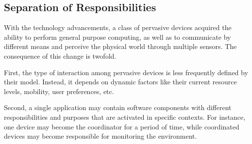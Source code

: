 





\subsection{Separation of Responsibilities}



With the technology advancements, a class of pervasive devices acquired the ability to perform general purpose computing, as well as to communicate by different means and perceive the physical world through multiple sensors. The consequence of this change is twofold.

First, the type of interaction among pervasive devices is less frequently defined by their model. Instead, it depends on dynamic factors like their current resource levels, mobility, user preferences, etc. 

Second, a single application may contain software components with different responsibilities and purposes that are activated in specific contexts. For instance, one device may become the coordinator for a period of time, while coordinated devices may become responsible for monitoring the environment. 

